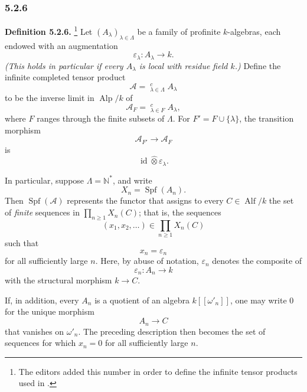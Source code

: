 
\subsubsection*{5.2.6}
\label{sga3:VIIB:5.2.6}

\noindent\textbf{Definition 5.2.6.}
\footnote{\label{sga3:VIIB:nde:164}The editors added this number
in order to define the infinite tensor products used in .}
Let \((A_\lambda)_{\lambda\in\Lambda}\) be a family of profinite
\(k\)-algebras, each endowed with an augmentation
\[
  \varepsilon_\lambda:A_\lambda\longrightarrow k.
\]
\textit{(This holds in particular if every \(A_\lambda\) is
local with residue field \(k\).)}
Define the infinite completed tensor product
\[
  \mathcal A
  =
  \mathop{\widehat{\bigotimes}}\nolimits^{c}_{\lambda\in\Lambda}
  A_\lambda
\]
to be the inverse limit in \(\operatorname{Alp}/k\) of
\[
  \mathcal A_F
  =
  \mathop{\widehat{\bigotimes}}\nolimits^{c}_{\lambda\in F}
  A_\lambda,
\]
where \(F\) ranges through the finite subsets of \(\Lambda\).
For \(F'=F\cup\{\lambda\}\), the transition morphism
\[
  \mathcal A_{F'}\longrightarrow\mathcal A_F
\]
is
\[
  \operatorname{id}\widehat\otimes\varepsilon_\lambda.
\]

In particular, suppose \(\Lambda=\mathbb N^*\), and write
\[
  X_n=\operatorname{Spf}(A_n).
\]
Then \(\operatorname{Spf}(\mathcal A)\) represents the functor
that assigns to every \(C\in\operatorname{Alf}/k\) the set of
\emph{finite} sequences in
\(\prod_{n\geq1}X_n(C)\); that is, the sequences
\[
  (x_1,x_2,\ldots)\in\prod_{n\geq1}X_n(C)
\]
such that
\[
  x_n=\varepsilon_n
\]
for all sufficiently large \(n\). Here, by abuse of notation,
\(\varepsilon_n\) denotes the composite of
\[
  \varepsilon_n:A_n\longrightarrow k
\]
with the structural morphism \(k\to C\).

If, in addition, every \(A_n\) is a quotient of an algebra
\(k[[\omega'_n]]\), one may write \(0\) for the unique morphism
\[
  A_n\longrightarrow C
\]
that vanishes on \(\omega'_n\). The preceding description then
becomes the set of sequences for which \(x_n=0\) for all
sufficiently large \(n\).
